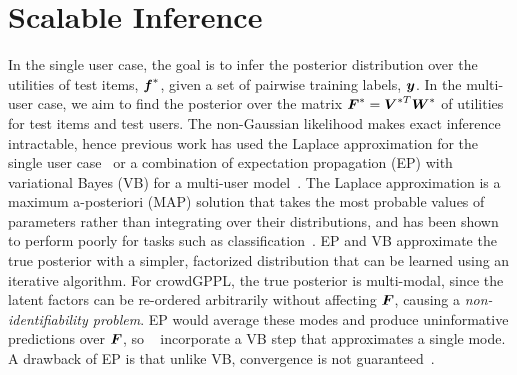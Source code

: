 \section{Scalable Inference}\label{sec:inf}

In the single user case, the goal is to infer the posterior distribution over the utilities of test items, $\boldsymbol f^*$, 
given a set of pairwise training labels, $\boldsymbol y$. In the multi-user case, we aim to find the posterior over the matrix
$\boldsymbol F^*=\boldsymbol V^{*T} \boldsymbol W^*$ of utilities for test items and test users.
The non-Gaussian likelihood makes exact inference intractable, hence previous work has used
 the Laplace approximation for the single user case~\citep{chu2005preference}
or a combination of expectation propagation (EP) with variational Bayes (VB) for a 
multi-user model~\citep{houlsby2012collaborative}.
The Laplace approximation is a maximum a-posteriori (MAP) solution that
takes the most probable values of parameters rather than integrating over their distributions,
and has been shown to perform poorly for tasks such as classification~\citep{nickisch2008approximations}. 
EP and VB approximate the true posterior with a simpler, factorized distribution
that can be learned using an iterative algorithm.
For crowdGPPL, the true posterior is multi-modal, since the latent factors can be re-ordered arbitrarily without
affecting $\boldsymbol F$, causing a \emph{non-identifiability problem}.
EP would average these modes and produce uninformative predictions over $\boldsymbol F$, so
~\citet{houlsby2012collaborative} incorporate a VB step that approximates a single mode.
A drawback of EP is that unlike VB, convergence is not guaranteed~\citep{minka2001expectation}.

